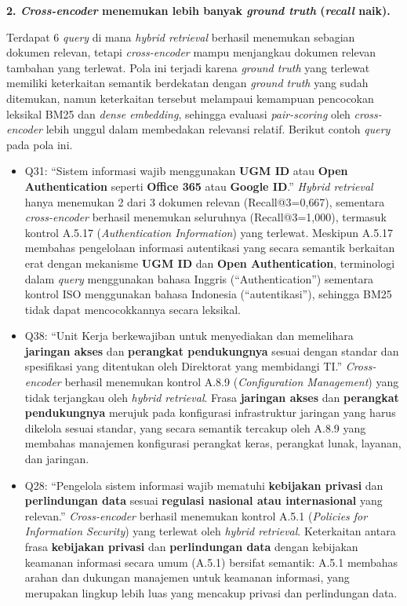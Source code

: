 \textbf{2. \textit{Cross-encoder} menemukan lebih banyak \textit{ground truth} (\textit{recall} naik).}

Terdapat 6 \textit{query} di mana \textit{hybrid retrieval} berhasil menemukan sebagian dokumen relevan, tetapi \textit{cross-encoder} mampu menjangkau dokumen relevan tambahan yang terlewat. Pola ini terjadi karena \textit{ground truth} yang terlewat memiliki keterkaitan semantik berdekatan dengan \textit{ground truth} yang sudah ditemukan, namun keterkaitan tersebut melampaui kemampuan pencocokan leksikal BM25 dan \textit{dense embedding}, sehingga evaluasi \textit{pair-scoring} oleh \textit{cross-encoder} lebih unggul dalam membedakan relevansi relatif. Berikut contoh \textit{query} pada pola ini.

\begin{itemize}
	\item Q31: ``Sistem informasi wajib menggunakan \textbf{UGM ID} atau \textbf{Open Authentication} seperti \textbf{Office 365} atau \textbf{Google ID}.'' \textit{Hybrid retrieval} hanya menemukan 2 dari 3 dokumen relevan (Recall@3=0{,}667), sementara \textit{cross-encoder} berhasil menemukan seluruhnya (Recall@3=1{,}000), termasuk kontrol A.5.17 (\textit{Authentication Information}) yang terlewat. Meskipun A.5.17 membahas pengelolaan informasi autentikasi yang secara semantik berkaitan erat dengan mekanisme \textbf{UGM ID} dan \textbf{Open Authentication}, terminologi dalam \textit{query} menggunakan bahasa Inggris (``Authentication'') sementara kontrol ISO menggunakan bahasa Indonesia (``autentikasi''), sehingga BM25 tidak dapat mencocokkannya secara leksikal.
	\item Q38: ``Unit Kerja berkewajiban untuk menyediakan dan memelihara \textbf{jaringan akses} dan \textbf{perangkat pendukungnya} sesuai dengan standar dan spesifikasi yang ditentukan oleh Direktorat yang membidangi TI.'' \textit{Cross-encoder} berhasil menemukan kontrol A.8.9 (\textit{Configuration Management}) yang tidak terjangkau oleh \textit{hybrid retrieval}. Frasa \textbf{jaringan akses} dan \textbf{perangkat pendukungnya} merujuk pada konfigurasi infrastruktur jaringan yang harus dikelola sesuai standar, yang secara semantik tercakup oleh A.8.9 yang membahas manajemen konfigurasi perangkat keras, perangkat lunak, layanan, dan jaringan.
	\item Q28: ``Pengelola sistem informasi wajib mematuhi \textbf{kebijakan privasi} dan \textbf{perlindungan data} sesuai \textbf{regulasi nasional atau internasional} yang relevan.'' \textit{Cross-encoder} berhasil menemukan kontrol A.5.1 (\textit{Policies for Information Security}) yang terlewat oleh \textit{hybrid retrieval}. Keterkaitan antara frasa \textbf{kebijakan privasi} dan \textbf{perlindungan data} dengan kebijakan keamanan informasi secara umum (A.5.1) bersifat semantik: A.5.1 membahas arahan dan dukungan manajemen untuk keamanan informasi, yang merupakan lingkup lebih luas yang mencakup privasi dan perlindungan data.
\end{itemize}

